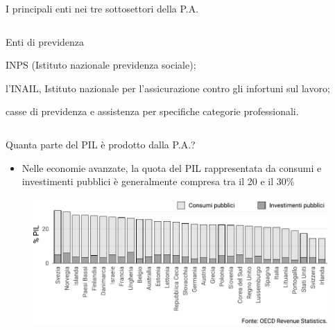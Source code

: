 \documentclass[aspectratio=149,11pt,italian]{beamer}
\newenvironment{nobulletlist}{\begin{list}{--}{\itemsep=.5pt\itemindent=2.5ex\leftmargin=0pt}}{\end{list}}
\begin{document}
\begin{frame}{I principali enti nei tre sottosettori della P.A.}
\begin{columns}[t]
\begin{column}{.33\columnwidth}
\begin{block}{\footnotesize Enti di previdenza}
\fontsize{8}{8}\selectfont
\begin{nobulletlist}
\item INPS (Istituto nazionale previdenza sociale);
\item l’INAIL, Istituto nazionale per l’assicurazione contro gli infortuni sul lavoro;
\item casse di previdenza e assistenza per specifiche categorie professionali.
\end{nobulletlist}
\end{block}
\end{column}
\end{columns}
\end{frame}

\begin{frame}{Quanta parte del PIL è prodotto dalla P.A.?}
\begin{itemize}
\item Nelle economie avanzate, la quota del PIL rappresentata da consumi e
investimenti pubblici è generalmente compresa tra il 20 e il 30\%
\end{itemize}

\begin{figure}
\centering
\includegraphics[width=.9\textwidth]{./figure/consumi-investimenti-pubblici-PIL.pdf}
\end{figure}
\end{frame}
\end{document}
